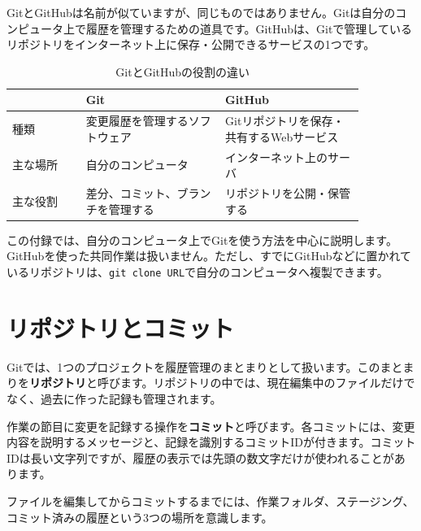 GitとGitHubは名前が似ていますが、同じものではありません。Gitは自分のコンピュータ上で履歴を管理するための道具です。GitHubは、Gitで管理しているリポジトリをインターネット上に保存・公開できるサービスの1つです。

\begin{table}[htbp]
    \centering
    \caption{GitとGitHubの役割の違い}
    \label{tab:appendix-git-vs-github}
    \begin{tabular}{p{0.18\linewidth}p{0.34\linewidth}p{0.34\linewidth}}
        \toprule
        & Git & GitHub \\
        \midrule
        種類 & 変更履歴を管理するソフトウェア & Gitリポジトリを保存・共有するWebサービス \\
        主な場所 & 自分のコンピュータ & インターネット上のサーバ \\
        主な役割 & 差分、コミット、ブランチを管理する & リポジトリを公開・保管する \\
        \bottomrule
    \end{tabular}
\end{table}

この付録では、自分のコンピュータ上でGitを使う方法を中心に説明します。GitHubを使った共同作業は扱いません。ただし、すでにGitHubなどに置かれているリポジトリは、\texttt{git clone URL}で自分のコンピュータへ複製できます。

\section{リポジトリとコミット}

Gitでは、1つのプロジェクトを履歴管理のまとまりとして扱います。このまとまりを\textbf{リポジトリ}と呼びます。リポジトリの中では、現在編集中のファイルだけでなく、過去に作った記録も管理されます。

作業の節目に変更を記録する操作を\textbf{コミット}と呼びます。各コミットには、変更内容を説明するメッセージと、記録を識別するコミットIDが付きます。コミットIDは長い文字列ですが、履歴の表示では先頭の数文字だけが使われることがあります。

ファイルを編集してからコミットするまでには、作業フォルダ、ステージング、コミット済みの履歴という3つの場所を意識します。

